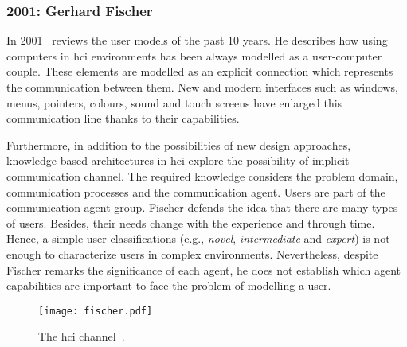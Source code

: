 \subsubsection{2001: Gerhard Fischer}
\label{sec:fischer_user_2001}

In 2001~\citet{fischer_user_2001} reviews the user models of the past 10 years. 
He describes how using computers in \ac{hci} environments has been always
modelled as a user-computer couple. These elements are modelled as an explicit 
connection which represents the communication between them. New and modern 
interfaces such as windows, menus, pointers, colours, sound and touch screens 
have enlarged this communication line thanks to their capabilities.

Furthermore, in addition to the possibilities of new design approaches,
knowledge-based architectures in \ac{hci} explore the possibility of implicit
communication channel. The required knowledge considers the problem domain,
communication processes and the communication agent. Users are part of the
communication agent group. Fischer defends the idea that there are many types of
users. Besides, their needs change with the experience and through time.
Hence, a simple user classifications (e.g., \textit{novel}, \textit{intermediate}
and \textit{expert}) is not enough to characterize users in complex environments. 
Nevertheless, despite Fischer remarks the significance of each agent, he does 
not establish which agent capabilities are important to face the problem of 
modelling a user.


\begin{figure}
\centering
\texttt{[image: fischer.pdf]}
\caption{The \ac{hci} channel~\citep{fischer_user_2001}.}
\label{fig:fischer}
\end{figure}